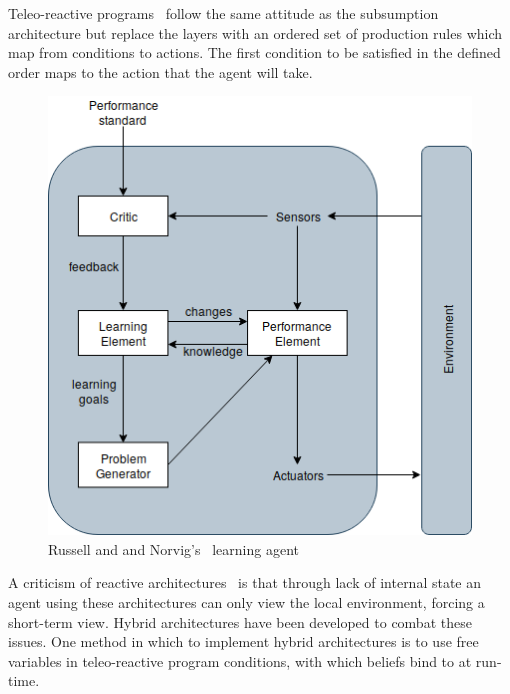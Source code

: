 \documentclass[]{final_report}
\begin{document}
Teleo-reactive programs~\cite{nilsson1993teleo} follow the same attitude as the subsumption architecture but replace the layers with an ordered set of production rules which map from conditions to actions. The first condition to be satisfied in the defined order maps to the action that the agent will take.\par 
\begin{figure}
\vspace{-20pt}
\begin{framed}
	\center
	\includegraphics[width=\textwidth]{LearningAgent.png}
	\caption{Russell and and Norvig's~\cite{russell2016artificial} learning agent}
	\label{fig:learning}
\end{framed}
\vspace{-30pt}
\end{figure}
A criticism of reactive architectures~\cite{wooldridge2009introduction} is that through lack of internal state an agent using these architectures can only view the local environment, forcing a short-term view. Hybrid architectures have been developed to combat these issues. One method in which to implement hybrid architectures is to use free variables in teleo-reactive program conditions, with which beliefs bind to at run-time.\par 
\end{document}
